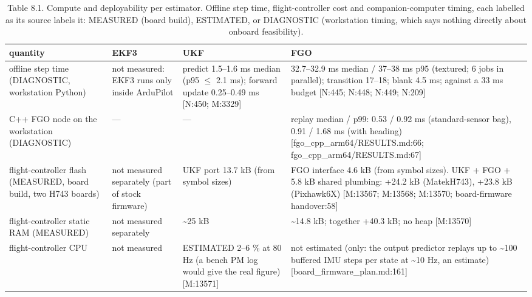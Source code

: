 \begin{table}[htbp]
\centering
\scriptsize
\caption{Table 8.1. Compute and deployability per estimator. Offline step time, flight-controller cost and companion-computer timing, each labelled as its source labels it: MEASURED (board build), ESTIMATED, or DIAGNOSTIC (workstation timing, which says nothing directly about onboard feasibility).}
\label{tab:8-1}
\begin{tabular}{p{}p{}p{}p{}}
\toprule
\textbf{quantity} & \textbf{EKF3} & \textbf{UKF} & \textbf{FGO} \\
\midrule
offline step time (DIAGNOSTIC, workstation Python) & not measured: EKF3 runs only inside ArduPilot & predict 1.5--1.6 ms median (p95 $\le$ 2.1 ms); forward update 0.25--0.49 ms [N:450; M:3329] & 32.7--32.9 ms median / 37--38 ms p95 (textured; 6 jobs in parallel); transition 17--18; blank 4.5 ms; against a 33 ms budget [N:445; N:448; N:449; N:209] \\
C++ FGO node on the workstation (DIAGNOSTIC) & --- & --- & replay median / p99: 0.53 / 0.92 ms (standard-sensor bag), 0.91 / 1.68 ms (with heading) [fgo\_cpp\_arm64/RESULTS.md:66; fgo\_cpp\_arm64/RESULTS.md:67] \\
flight-controller flash (MEASURED, board build, two H743 boards) & not measured separately (part of stock firmware) & UKF port 13.7 kB (from symbol sizes) & FGO interface 4.6 kB (from symbol sizes). UKF + FGO + 5.8 kB shared plumbing: +24.2 kB (MatekH743), +23.8 kB (Pixhawk6X) [M:13567; M:13568; M:13570; board-firmware handover:58] \\
flight-controller static RAM (MEASURED) & not measured separately & \textasciitilde{}25 kB & \textasciitilde{}14.8 kB; together +40.3 kB; no heap [M:13570] \\
flight-controller CPU & not measured & ESTIMATED 2--6 \% at 80 Hz (a bench PM log would give the real figure) [M:13571] & not estimated (only: the output predictor replays up to \textasciitilde{}100 buffered IMU steps per state at \textasciitilde{}10 Hz, an estimate) [board\_firmware\_plan.md:161] \\

\end{tabular}
\end{table}
